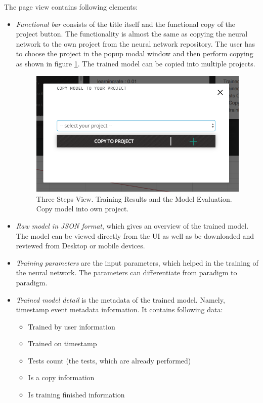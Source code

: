 The page view contains following elements:
\begin{itemize}
\item \emph{Functional bar} consists of the title itself and the functional copy of the project button. The functionality is almost the same as copying the neural network to the own project from the neural network repository. The user has to choose the project in the popup modal window and then perform copying as shown in figure \ref{fig:copy_model}. The trained model can be copied into multiple projects. 

\begin{figure}[htbp]
\begin{center}
  \includegraphics[scale=0.5]{components/5/img/copy_model.png}
  \caption{Three Steps View. Training Results and the Model Evaluation. Copy model into own project.}
  \label{fig:copy_model}
\end{center}
\end{figure}

\item \emph{Raw model in JSON format}, which gives an overview of the trained model. The model can be viewed directly from the UI as well as be downloaded and reviewed from Desktop or mobile devices. 
\item \emph{Training parameters} are the input parameters, which helped in the training of the neural network. The parameters can differentiate from paradigm to paradigm.
\item \emph{Trained model detail} is the metadata of the trained model. Namely, timestamp event metadata information. It contains following data:
\begin{itemize}
\item Trained by user information
\item Trained on timestamp
\item Tests count (the tests, which are already performed)
\item Is a copy information
\item Is training finished information
\end{itemize}


\end{itemize}
